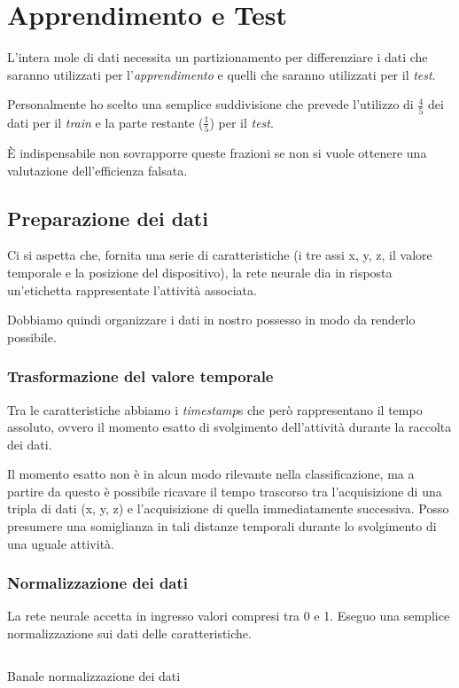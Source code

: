 \section{Apprendimento e Test}

L'intera mole di dati necessita un partizionamento per differenziare i dati che saranno utilizzati per 
l'\textit{apprendimento} e quelli che saranno utilizzati per il \textit{test}.

Personalmente ho scelto una semplice suddivisione che prevede l'utilizzo di $\frac{4}{5}$ dei dati per il \textit{train} e 
la parte restante ($\frac{1}{5}$) per il \textit{test}.

È indispensabile non sovrapporre queste frazioni se non si vuole ottenere una valutazione dell'efficienza falsata.

\subsection{Preparazione dei dati}
Ci si aspetta che, fornita una serie di caratteristiche (i tre assi x, y, z, il valore temporale e 
la posizione del dispositivo), la rete neurale dia in risposta un'etichetta rappresentate l'attività associata.

Dobbiamo quindi organizzare i dati in nostro possesso in modo da renderlo possibile.

\subsubsection{Trasformazione del valore temporale}
Tra le caratteristiche abbiamo i \textit{timestamp}s che però rappresentano il tempo assoluto, 
ovvero il momento esatto di svolgimento dell'attività durante la raccolta dei dati.

Il momento esatto non è in alcun modo rilevante nella classificazione, ma a partire da questo è possibile ricavare il tempo trascorso 
tra l'acquisizione di una tripla di dati (x, y, z) e l'acquisizione di quella immediatamente successiva.
Posso presumere una somiglianza in tali distanze temporali durante lo svolgimento di una uguale attività.

\subsubsection{Normalizzazione dei dati}
La rete neurale accetta in ingresso valori compresi tra 0 e 1. Eseguo una semplice normalizzazione sui dati delle caratteristiche.
\begin{listing}[H] 
    \inputminted[frame=single,framesep=10pt]{python}{snippets/normalize_data.py}
    \caption{Banale normalizzazione dei dati}
\end{listing}

